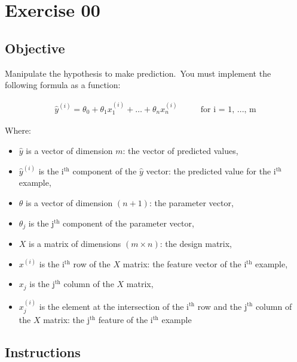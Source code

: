 \chapter{Exercise 00}

\newpage
{}
\makeheaderfilesforbidden

\section*{Objective}
Manipulate the hypothesis to make prediction.\
You must implement the following formula as a function:

$$
\begin{matrix}
  \hat{y}^{(i)} = \theta_0 + \theta_1 x_{1}^{(i)}  + \dots + \theta_n x_{n}^{(i)} && & \text{ for i = 1, ..., m}
\end{matrix}
$$
  
Where:
\begin{itemize}
  \item $\hat{y}$ is a vector of dimension $m$: the vector of predicted values,
  \item $\hat{y}^{(i)}$ is the i$^\text{th}$ component of the $\hat{y}$ vector: the predicted value for the i$^\text{th}$ example,
  \item $\theta$ is a vector of dimension $(n + 1)$: the parameter vector,
  \item $\theta_j$ is the j$^\text{th}$ component of the parameter vector,
  \item $X$ is a matrix of dimensions $(m \times n)$: the design matrix,
  \item $x^{(i)}$ is the i$^\text{th}$ row of the $X$ matrix: the feature vector of the i$^\text{th}$ example,
  \item $x_{j}$ is the j$^\text{th}$ column of the $X$ matrix,
  \item $x_j^{(i)}$ is the element at the intersection of the i$^\text{th}$ row and the j$^\text{th}$ column of the $X$ matrix: the j$^\text{th}$ feature of the i$^\text{th}$ example
\end{itemize}


\section*{Instructions}

